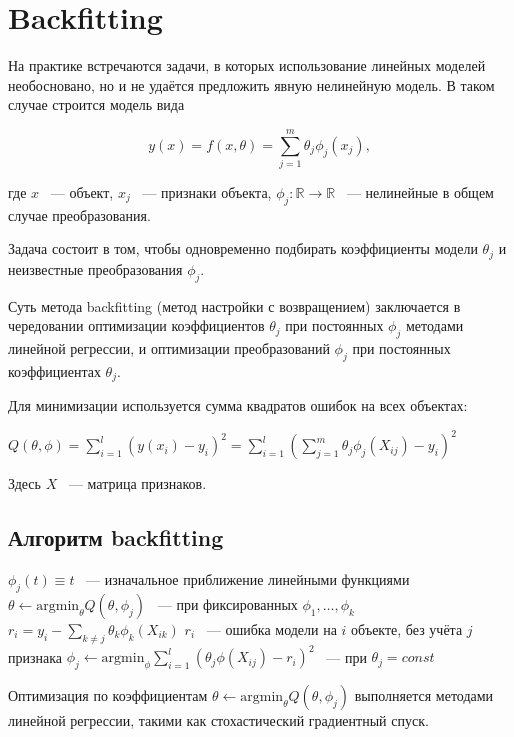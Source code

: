 \usepackage{algpseudocode}
\section{Backfitting}

На практике встречаются задачи, в которых использование линейных моделей необосновано, но и не удаётся предложить явную нелинейную модель. В таком случае строится модель вида

$$\displaystyle y(x)=f(x,\theta)=\sum_{j=1}^m\theta_j \phi_j(x_j),$$

где $x$ ~--- объект, $x_j$ ~--- признаки объекта, $\phi_j:\mathbb{R}\rightarrow \mathbb{R}$ ~--- нелинейные в общем случае преобразования.

Задача состоит в том, чтобы одновременно подбирать коэффициенты модели $\theta_j$ и неизвестные преобразования $\phi_j$.

Суть метода backfitting (метод настройки с возвращением) заключается в чередовании оптимизации коэффициентов $\theta_j$ при постоянных $\phi_j$ методами линейной регрессии, и оптимизации преобразований $\phi_j$ при постоянных коэффициентах $\theta_j$. 

Для минимизации используется сумма квадратов ошибок на всех объектах:

$Q(\theta, \phi) = \displaystyle \sum_{i=1}^l \left( y(x_i) - y_i \right)^2 = \sum_{i=1}^l \left( \sum_{j=1}^m \theta_j \phi_j(X_{ij}) - y_i \right)^2 $

Здесь $X$ ~--- матрица признаков.

\subsection{Алгоритм backfitting}
\begin{algorithmic}
\State $\phi_j(t) \equiv t$ ~--- изначальное приближение линейными функциями
    \State $\theta \gets \text{argmin}_{\theta}Q(\theta, \phi_j)$ ~--- при фиксированных $\phi_1,\dots, \phi_k$
        \State $\displaystyle r_i = y_i - \sum_{k\neq j} \theta_k \phi_k(X_{ik})$
        \State $r_i$ ~--- ошибка модели на $i$ объекте, без учёта $j$ признака
        \State $\displaystyle\phi_j \gets \text{argmin}_{\phi} \sum_{i=1}^l \left( \theta_j \phi(X_{ij}) - r_i \right)^2$ ~--- при $\theta_j=const$
    \EndFor
\EndWhile 
\end{algorithmic}

Оптимизация по коэффициентам $\theta \gets \text{argmin}_{\theta}Q(\theta, \phi_j)$ выполняется методами линейной регрессии, такими как стохастический градиентный спуск.

